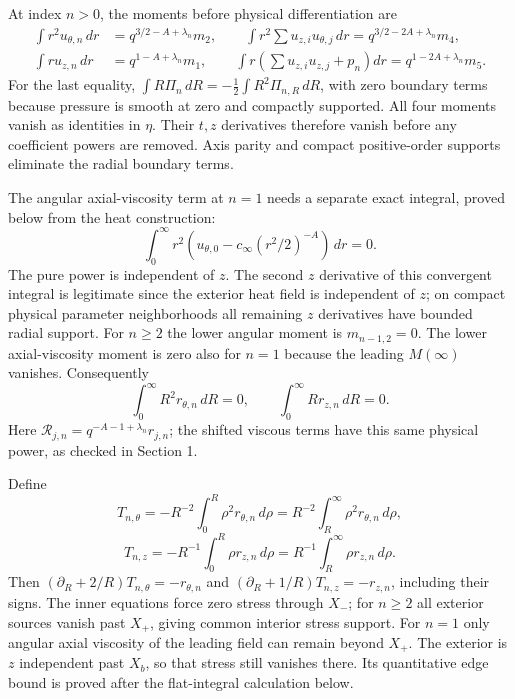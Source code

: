 \documentclass[10pt,a4paper]{article}
\newcommand{\res}{\mathcal R}
\begin{document}
At index $n>0$, the moments before physical differentiation are
\begin{align*}
\int r^2u_{\theta,n}\,dr&=q^{3/2-A+\lambda_n}m_2,\qquad
\int r^2\sum u_{z,i}u_{\theta,j}\,dr=q^{3/2-2A+\lambda_n}m_4,\\
\int ru_{z,n}\,dr&=q^{1-A+\lambda_n}m_1,\qquad
\int r\left(\sum u_{z,i}u_{z,j}+p_n\right)dr
=q^{1-2A+\lambda_n}m_5.
\end{align*}
For the last equality,
$\int R\Pi_n\,dR=-\tfrac12\int R^2\Pi_{n,R}\,dR$, with zero boundary
terms because pressure is smooth at zero and compactly supported.
All four moments vanish as identities in $\eta$. Their $t,z$ derivatives
therefore vanish before any coefficient powers are removed. Axis parity and
compact positive-order supports eliminate the radial boundary terms.

The angular axial-viscosity term at $n=1$ needs a separate exact integral,
proved below from the heat construction:
\begin{equation}\label{eq:submoment}
 \int_0^\infty r^2(u_{\theta,0}-c_\infty(r^2/2)^{-A})\,dr=0.
\end{equation}
The pure power is independent of $z$. The second $z$ derivative of this
convergent integral is legitimate since the exterior heat field is independent
of $z$; on compact physical parameter neighborhoods all remaining $z$ derivatives
have bounded radial support. For $n\ge2$ the lower angular moment is $m_{n-1,2}=0$.
The lower axial-viscosity moment is zero also for $n=1$ because the leading
$M(\infty)$ vanishes. Consequently
\[
\int_0^\infty R^2r_{\theta,n}\,dR=0,
\qquad\int_0^\infty Rr_{z,n}\,dR=0.
\]
Here $\res_{j,n}=q^{-A-1+\lambda_n}r_{j,n}$; the shifted viscous terms
have this same physical power, as checked in Section 1.

Define
\[
T_{n,\theta}=-R^{-2}\int_0^R\rho^2r_{\theta,n}\,d\rho
=R^{-2}\int_R^\infty\rho^2r_{\theta,n}\,d\rho,
\]
\[
T_{n,z}=-R^{-1}\int_0^R\rho r_{z,n}\,d\rho
=R^{-1}\int_R^\infty\rho r_{z,n}\,d\rho.
\]
Then $(\partial_R+2/R)T_{n,\theta}=-r_{\theta,n}$ and
$(\partial_R+1/R)T_{n,z}=-r_{z,n}$, including their signs.
The inner equations force zero stress through $X_-$; for $n\ge2$ all exterior
sources vanish past $X_+$, giving common interior stress support. For $n=1$
only angular axial viscosity of the leading field can remain beyond $X_+$.
The exterior is $z$ independent past $X_b$, so that stress still vanishes there.
Its quantitative edge bound is proved after the flat-integral calculation below.
\end{document}
